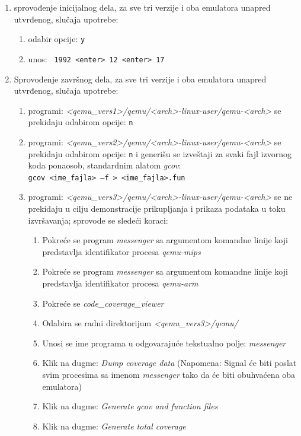 \documentclass[12pt,oneside]{memoir}
\newcommand{\kod}[1]{\texttt{#1}}
\newcommand{\strano}[1]{\textit{#1}}
\begin{document}
\begin{enumerate}
\item sprovođenje inicijalnog dela, za sve tri verzije i oba emulatora unapred utvrđenog, slučaja upotrebe:
\begin{enumerate}
\item odabir opcije: \kod{y}
\item unos: \kod{ 1992 <enter> 12 <enter> 17}
\end{enumerate}

\item Sprovođenje završnog dela, za sve tri verzije i oba emulatora unapred utvrđenog, slučaja upotrebe:
\begin{enumerate}
\item programi: \strano{<qemu\_vers1>/qemu/<arch>-linux-user/qemu-<arch>} se prekidaju odabirom opcije: \kod{n}
\item programi: \strano{<qemu\_vers2>/qemu/<arch>-linux-user/qemu-<arch>} se prekidaju odabirom opcije: \kod{n} i generišu se izveštaji za svaki fajl izvornog koda ponaosob, standardnim alatom \strano{gcov}: \\
\kod{gcov <ime\_fajla> –f  > <ime\_fajla>.fun}
\item programi: \strano{<qemu\_vers3>/qemu/<arch>-linux-user/qemu-<arch>} se ne prekidaju u cilju demonstracije prikupljanja i prikaza podataka u toku izvršavanja; sprovode se sledeći koraci:
\begin{enumerate}
\item Pokreće se program \strano{messenger} sa argumentom komandne linije koji predstavlja identifikator procesa \strano{qemu-mips}
\item Pokreće se program \strano{messenger} sa argumentom komandne linije koji predstavlja identifikator procesa \strano{qemu-arm}
\item Pokreće se \strano{code\_coverage\_viewer}
\item Odabira se radni direktorijum \strano{<qemu\_vers3>/qemu/}
\item Unosi se ime programa u odgovarajuće tekstualno polje: \strano{messenger}
\item  Klik na dugme: \strano{Dump coverage data} (Napomena: Signal će biti poslat svim procesima sa imenom \strano{messenger} tako da će biti obuhvaćena oba emulatora)
\item Klik na dugme: \strano{Generate gcov and function files}
\item Klik na dugme: \strano{Generate total coverage}
\end{enumerate}
\end{enumerate}


\end{enumerate}
\end{document}
